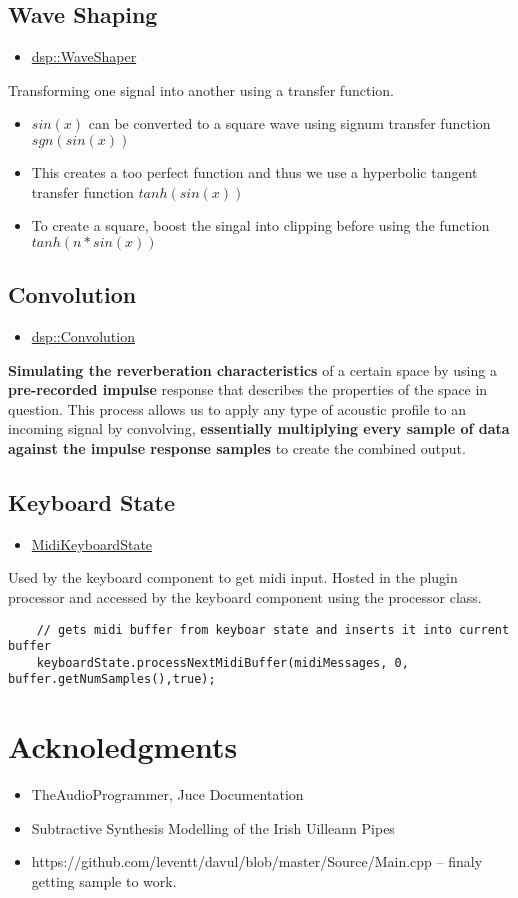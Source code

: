 \documentclass{article}
\begin{document}
	
	\subsection{Wave Shaping}
	\begin{itemize}
		\item \href{https://docs.juce.com/master/structdsp_1_1WaveShaper.html}{dsp::WaveShaper}
	\end{itemize}
	Transforming one signal into another using a transfer function.

	
	\begin{itemize}
		\item $sin(x)$ can be converted to a square wave using signum transfer function $sgn(sin(x))$
		\item This creates a too perfect function and thus we use a hyperbolic tangent transfer function $tanh(sin(x))$
		\item To create a square, boost the singal into clipping before using the function $tanh(n*sin(x))$
	\end{itemize}
	
	\subsection{Convolution}
	\begin{itemize}
		\item \href{https://docs.juce.com/master/classdsp_1_1Convolution.html}{dsp::Convolution}
	\end{itemize}
	\textbf{Simulating the reverberation characteristics} of a certain space by using a \textbf{pre-recorded impulse} response that describes the properties of the space in question. This process allows us to apply any type of acoustic profile to an incoming signal by convolving, \textbf{essentially multiplying every sample of data against the impulse response samples} to create the combined output.
	
	
	\subsection{Keyboard State}
	\begin{itemize}
		\item \href{https://docs.juce.com/develop/classMidiKeyboardState.html}{MidiKeyboardState}
	\end{itemize}
	Used by the keyboard component to get midi input. Hosted in the plugin processor and accessed by the keyboard component using the processor class.
	\begin{lstlisting}
	// gets midi buffer from keyboar state and inserts it into current buffer
	keyboardState.processNextMidiBuffer(midiMessages, 0, buffer.getNumSamples(),true);
	\end{lstlisting}
	
	
\section{Acknoledgments}
\begin{itemize}
	\item TheAudioProgrammer, Juce Documentation 
	\item Subtractive Synthesis Modelling of the Irish Uilleann Pipes
	\item https://github.com/leventt/davul/blob/master/Source/Main.cpp -- finaly getting sample to work.
\end{itemize}
	
	
\end{document}
